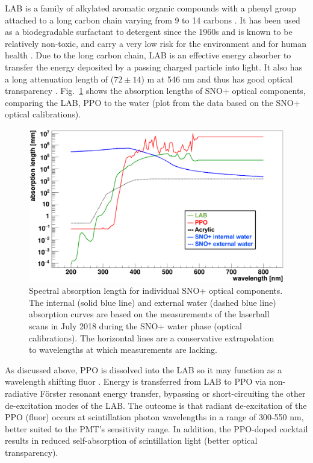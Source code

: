 LAB is a family of alkylated aromatic organic compounds with a phenyl group attached to a long carbon chain varying from 9 to 14 carbons \cite{collaboration2020development,wiki_LAB}. It has been used as a biodegradable surfactant to detergent since the 1960s and is known to be relatively non-toxic, and carry a very low risk for the environment and for human health \cite{wiki_LAB}. Due to the long carbon chain, LAB is an effective energy absorber to transfer the energy deposited by a passing charged particle into light. It also has a long attenuation length of ($72\pm 14$) m at 546 nm and thus has good optical transparency \cite{snop_jinst}. Fig.~\ref{absLength} shows the absorption lengths of SNO+ optical components, comparing the LAB, PPO to the water (plot from the data based on the SNO+ optical calibrations).
\begin{figure}[!htb]
	\centering
	\includegraphics[width=12cm]{absLength.png}
	\caption[Spectral absorption length for SNO+ optical components.]{Spectral absorption length for individual SNO+ optical components. The internal (solid blue line) and external water (dashed blue line) absorption curves are based on the measurements of the laserball scans in July 2018 during the SNO+ water phase (optical calibrations). The horizontal lines are a conservative extrapolation to wavelengths at which measurements are lacking.}
	\label{absLength}
\end{figure}

As discussed above, PPO is dissolved into the LAB so it may function as a wavelength shifting fluor \cite{wunderly1990new}. Energy is transferred from LAB to PPO via non-radiative F{\"o}rster resonant energy transfer, bypassing or short-circuiting the other de-excitation modes of the LAB. The outcome is that radiant de-excitation of the PPO (fluor) occurs at scintillation photon wavelengths in a range of 300-550 nm, better suited to the PMT's sensitivity range. In addition, the PPO-doped cocktail results in reduced self-absorption of scintillation light (better optical transparency). 

